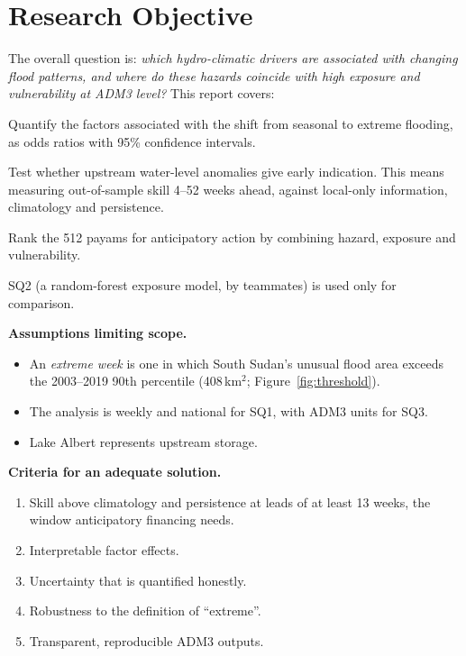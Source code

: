 \documentclass[11pt,a4paper]{article}
\begin{document}
\section{Research Objective}
The overall question is: \emph{which hydro-climatic drivers are associated with changing flood patterns, and where do
these hazards coincide with high exposure and vulnerability at ADM3 level?} This report covers:

\begin{description}\setlength\itemsep{0pt}
\item[SQ1a] Quantify the factors associated with the shift from seasonal to extreme flooding, as odds ratios with 95\%
confidence intervals.
\item[SQ1b] Test whether upstream water-level anomalies give early indication. This means measuring out-of-sample
skill 4--52 weeks ahead, against local-only information, climatology and persistence.
\item[SQ3] Rank the 512 payams for anticipatory action by combining hazard, exposure and vulnerability.
\end{description}

SQ2 (a random-forest exposure model, by teammates) is used only for comparison.

\textbf{Assumptions limiting scope.}
\begin{itemize}\setlength\itemsep{0pt}
\item An \emph{extreme week} is one in which South Sudan's unusual flood area exceeds the 2003--2019 90th percentile
(408\,km$^2$; Figure~\ref{fig:threshold}).
\item The analysis is weekly and national for SQ1, with ADM3 units for SQ3.
\item Lake Albert represents upstream storage.
\end{itemize}

\textbf{Criteria for an adequate solution.}
\begin{enumerate}\setlength\itemsep{0pt}
\item Skill above climatology and persistence at leads of at least 13 weeks, the window anticipatory financing needs.
\item Interpretable factor effects.
\item Uncertainty that is quantified honestly.
\item Robustness to the definition of ``extreme''.
\item Transparent, reproducible ADM3 outputs.
\end{enumerate}
\end{document}
